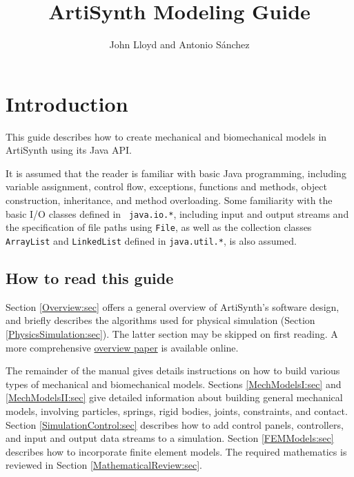 \documentclass{article}
\title{ArtiSynth Modeling Guide}
\author{John Lloyd and Antonio S\'anchez}
\date{}
\begin{document}
\maketitle

\iflatexml{\large\pubdate}\fi

\tableofcontents



\section{Introduction}

This guide describes how to create mechanical and biomechanical models
in ArtiSynth using its Java API. 

It is assumed that the reader is familiar with basic Java programming,
including variable assignment, control flow, exceptions, functions and
methods, object construction, inheritance, and method overloading.
Some familiarity with the basic I/O classes defined in {\tt
java.io.*}, including input and output streams and the specification
of file paths using {\tt File}, as well as the collection classes
{\tt ArrayList} and {\tt LinkedList} defined in {\tt java.util.*}, is
also assumed.

\subsection{How to read this guide}

Section \ref{Overview:sec} offers a general overview of ArtiSynth's
software design, and briefly describes the algorithms used for
physical simulation (Section \ref{PhysicsSimulation:sec}). The latter
section may be skipped on first reading. A more comprehensive
\href{http://www.artisynth.org/doc/artisynth.pdf}{overview paper} is
available online.

The remainder of the manual gives details instructions on how to build
various types of mechanical and biomechanical models.  Sections
\ref{MechModelsI:sec} and \ref{MechModelsII:sec} give detailed
information about building general mechanical models, involving
particles, springs, rigid bodies, joints, constraints, and
contact. Section \ref{SimulationControl:sec} describes how to add
control panels, controllers, and input and output data streams to a
simulation.  Section \ref{FEMModels:sec} describes how to incorporate
finite element models. The required mathematics is reviewed in Section
\ref{MathematicalReview:sec}.
\end{document}
